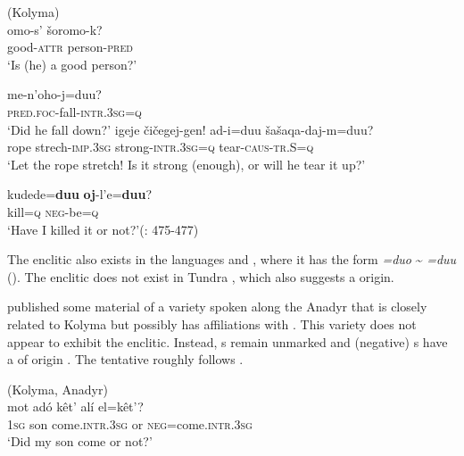 \ea%
    \label{ex:yuka:2}
     (Kolyma)\\
    \ea
    \gll omo-s’    šoromo-k?\\
    good-\textsc{attr}  person-\textsc{pred}\\
    \glt ‘Is (he) a good person?’
    
    \ex
    \gll me-n’oho-j={duu}?\\
    \textsc{pred.foc}-fall-\textsc{intr}.3\textsc{sg}=\textsc{q}\\
    \glt ‘Did he fall down?’
    \ex
    \gll igeje  čičegej-gen!  ad-i={duu} šašaqa-daj-m={duu}?\\
    rope  strech-\textsc{imp.3sg}  strong-\textsc{intr}.3\textsc{sg}=\textsc{q}  tear-\textsc{caus}-\textsc{tr.S}=\textsc{q}\\
    \glt ‘Let the rope stretch! Is it strong (enough), or will he tear it up?’
    
    \ex
    \gll kudede{=}\textbf{{d}}\textbf{{uu}} \textbf{{oj}}{{}-l}{’e}{=}\textbf{{d}}\textbf{{uu}}?\\
    kill=\textsc{q} \textsc{neg}-be=\textsc{q}\\
    \glt ‘Have I killed it or not?’(\citealt{Maslova2003a}: 475-477)\z\z

\noindent The enclitic also exists in the  languages  and , where it has the form \textit{=duo} {\textasciitilde} \textit{=duu} (). The enclitic does not exist in Tundra  \citep[150]{Nikolaeva2006}, which also suggests a  origin.

\citet{Schiefner1871} published some material of a variety spoken along the Anadyr that is closely related to Kolyma  but possibly has affiliations with  \citep[28]{Nikolaeva2006}. This variety does not appear to exhibit the enclitic. Instead, s remain unmarked and (negative) s have a  of  origin \citep[101]{Nikolaeva2006}. The tentative  roughly follows \citet{Maslova2003a}.

\ea%
    \label{ex:yuka:3}
     (Kolyma, Anadyr)\\
    \gll mot  adó  kêt’ alí el{=kêt’?}\\
    1\textsc{sg}  son  come.\textsc{intr}.3\textsc{sg}  or \textsc{neg}=come.\textsc{intr}.3\textsc{sg}\\
    \glt ‘Did my son come or not?’ \citep[92]{Schiefner1871}
    \z

